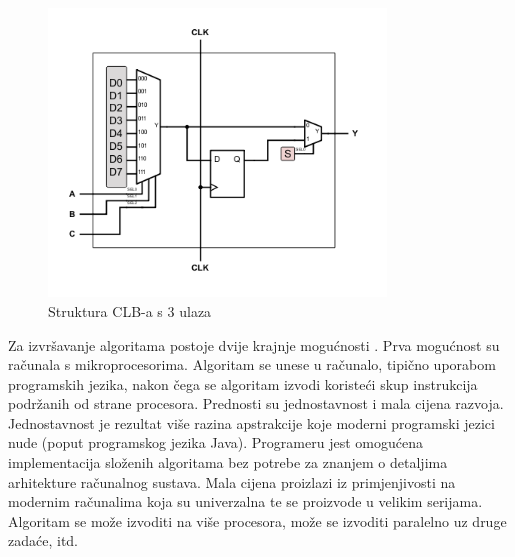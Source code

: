 \documentclass[times, utf8, diplomski]{fer}
\begin{document}
\begin{figure}[htb]
	\centering
	\includegraphics[width=0.8\textwidth]{img/CLB.png}
	\caption{Struktura CLB-a s $3$ ulaza}
	\label{fig:clb}
\end{figure}

Za izvršavanje algoritama postoje dvije krajnje mogućnosti \cite{article:reconfig}. Prva mogućnost su računala s mikroprocesorima. Algoritam se unese u računalo, tipično uporabom programskih jezika, nakon čega se algoritam izvodi koristeći skup instrukcija podržanih od strane procesora. Prednosti su jednostavnost i mala cijena razvoja. Jednostavnost je rezultat više razina apstrakcije koje moderni programski jezici nude (poput programskog jezika Java). Programeru jest omogućena implementacija složenih algoritama bez potrebe za znanjem o detaljima arhitekture računalnog sustava. Mala cijena proizlazi iz primjenjivosti na modernim računalima koja su univerzalna te se proizvode u velikim serijama. Algoritam se može izvoditi na više procesora, može se izvoditi paralelno uz druge zadaće, itd.
\end{document}
